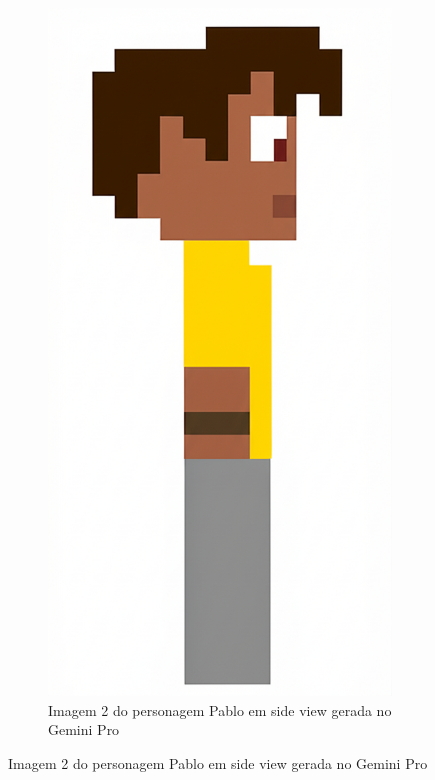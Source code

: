 \begin{figure}[htbp]
\begin{subfigure}{0.32\linewidth}
        \includegraphics[width=1\linewidth]{figs/geminiPro/melhores/chat2_2.png}
        \caption{\small Imagem 2 do personagem Pablo em side view gerada no Gemini Pro}
        \label{fig:chatGPTPabloGeminiPro2}
    \end{subfigure}

\end{figure}
